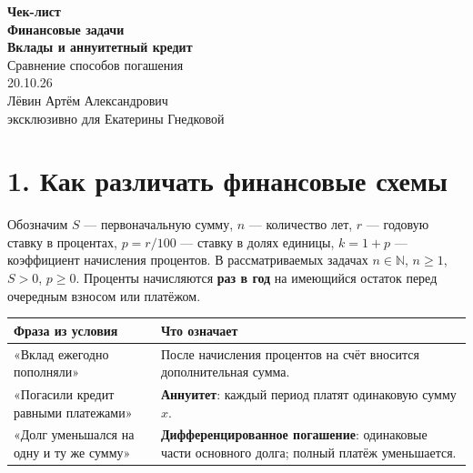 \documentclass[a4paper,12pt]{article}
\newcommand{\key}[1]{\textcolor{darkaccent}{\textbf{#1}}}
\begin{document}
\thispagestyle{empty}
\begin{center}
\vspace*{26mm}
{\Large\textcolor{accent}{\textbf{Чек-лист}}}\\[11mm]
{\huge\textbf{Финансовые задачи}}\\[8mm]
{\LARGE\textbf{Вклады и аннуитетный кредит}}\\[5mm]
{\large Сравнение способов погашения}\\[25mm]
{\large 20.10.26}\\[25mm]
{\large Лёвин Артём Александрович}\\[4mm]
{\large\textcolor{darkaccent}{эксклюзивно для Екатерины Гнедковой}}
\end{center}
\vfill
\begin{center}
\end{center}
\clearpage

\section*{1. Как различать финансовые схемы}

Обозначим $S$ --- первоначальную сумму, $n$ --- количество лет, $r$ --- годовую ставку в процентах, $p=r/100$ --- ставку в долях единицы, $k=1+p$ --- коэффициент начисления процентов. В рассматриваемых задачах $n\in\mathbb N$, $n\ge1$, $S>0$, $p\ge0$. Проценты начисляются \key{раз в год} на имеющийся остаток перед очередным взносом или платёжом.

\begin{center}
\renewcommand{\arraystretch}{1.28}
\begin{tabularx}{\linewidth}{@{}p{37mm}X@{}}
\toprule
\textbf{Фраза из условия} & \textbf{Что означает}\\
\midrule
«Вклад ежегодно пополняли» & После начисления процентов на счёт вносится дополнительная сумма.\\
«Погасили кредит равными платежами» & \key{Аннуитет}: каждый период платят одинаковую сумму $x$.\\
«Долг уменьшался на одну и ту же сумму» & \key{Дифференцированное погашение}: одинаковые части основного долга; полный платёж уменьшается.\\
\bottomrule
\end{tabularx}
\end{center}
\end{document}
